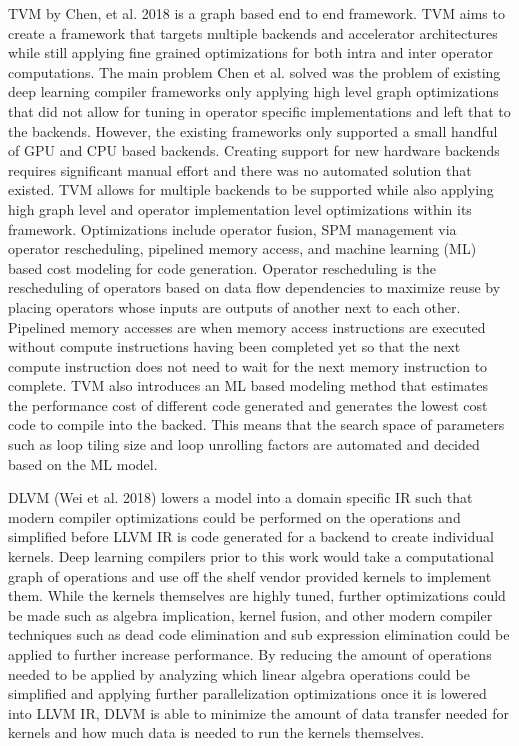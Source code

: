 TVM by Chen, et al. 2018 is a graph based end to end framework. 
TVM aims to create a framework that targets
multiple backends and accelerator architectures while still applying
fine grained optimizations for both intra and inter operator computations.
The main problem Chen et al. solved was the problem of existing deep learning
compiler frameworks only applying high level graph optimizations that did
not allow for tuning in operator specific implementations and left that to
the backends. However, the existing frameworks only supported a small handful
of GPU and CPU based backends. Creating support for new hardware backends
requires significant manual effort and there was no automated solution that 
existed. TVM allows for multiple backends to be supported while also
applying high graph level and operator implementation level optimizations
within its framework. Optimizations include operator fusion, SPM management via
operator rescheduling, pipelined memory access, and machine learning (ML) based
cost modeling for code generation. 
Operator rescheduling is the rescheduling of operators based
on data flow dependencies to maximize reuse by placing operators whose
inputs are outputs of another next to each other. Pipelined memory accesses are
when memory access instructions are executed without compute instructions having
been completed yet so that the next compute instruction does not need to wait
for the next memory instruction to complete. TVM also introduces an ML
based modeling method that estimates the performance cost of different
code generated and generates the lowest cost code to compile into the backed.
This means that the search space of parameters such as loop tiling size and 
loop unrolling factors are automated and decided based on the ML model.

DLVM \cite{DLVM} (Wei et al. 2018) lowers a model into a domain specific IR
such that modern compiler optimizations could be performed on the operations
and simplified before LLVM IR is code generated for a backend to create
individual kernels. Deep learning compilers \cite{tensorflow} \cite{torch}
prior to this work would take a computational graph of operations and use off
the shelf vendor provided kernels to implement them. While the kernels
themselves are highly tuned, further optimizations could be made such as
algebra implication, kernel fusion, and other modern compiler techniques such
as dead code elimination and sub expression elimination could be applied to
further increase performance. By reducing the amount of operations needed to be
applied by analyzing which linear algebra operations could be simplified and
applying further parallelization optimizations once it is lowered into LLVM IR,
DLVM is able to minimize the amount of data transfer needed for kernels and how
much data is needed to run the kernels themselves.

